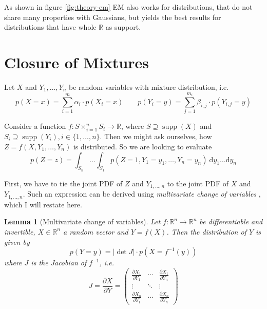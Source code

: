\documentclass[11pt,a4paper]{book}
\newtheorem{lemma}{Lemma}
\DeclareMathOperator{\supp}{supp}
\begin{document}
As shown in figure \ref{fig:theory-em} EM also works for distributions, that do
not share many properties with Gaussians, but yields the best results for
distributions that have whole $\mathbb{R}$ as support.

\section{Closure of Mixtures}
\label{sec:closure}

Let $X$ and $Y_{1}, \dots, Y_{n}$ be random variables with mixture distribution,
i.e.
\begin{equation*}
  p(X = x) = \sum_{i = 1}^{m} \alpha_{i} \cdot p(X_{i} = x) \qquad p(Y_{i} = y) = \sum_{j = 1}^{m_{i}} \beta_{i,j} \cdot p(Y_{i,j} = y)
\end{equation*}

Consider a function $f : S \times_{i = 1}^{n} S_{i} \rightarrow \mathbb{R}$,
where $S \supseteq \supp(X)$ and
$S_{i} \supseteq \supp(Y_{i}), i \in \{ 1, \dots, n \}$. Then we might ask
ourselves, how $Z = f(X, Y_{1}, \dots, Y_{n})$ is distributed. So we are looking
to evaluate
\begin{equation*}
  p(Z = z) = \int_{S_{n}}\dots\int_{S_{1}} p(Z = 1, Y_{1} = y_{1}, \dots, Y_{n} = y_{n})~\mathrm{d}y_{1}\dots\mathrm{d}y_{n}
\end{equation*}

First, we have to tie the joint PDF of $Z$ and $Y_{1, \dots, n}$ to the joint
PDF of $X$ and $Y_{1, \dots, n}$. Such an expression can be derived using
\emph{multivariate change of variables} \cite[chapter~2.6.2.1]{murphy}, which I
will restate here.

\begin{lemma}[Multivariate change of variables]
  \label{lemma:multivariate-change}
  Let $f : \mathbb{R}^{n} \rightarrow \mathbb{R}^{n}$ be differentiable and
  invertible, $X \in \mathbb{R}^{n}$ a random vector and $Y = f(X)$. Then the
  distribution of $Y$ is given by
  \begin{equation*}
    p(Y = y) = \left| \det J \right| \cdot p(X = f^{-1}(y))
  \end{equation*}
  where $J$ is the Jacobian of $f^{-1}$, i.e.
  \begin{equation*}
    J = \frac{\partial X}{\partial Y} = \begin{pmatrix}
      \frac{\partial X_{1}}{\partial Y_{1}} & \cdots & \frac{\partial X_{1}}{\partial Y_{n}}\\
      \vdots & \ddots & \vdots\\
      \frac{\partial X_{n}}{\partial Y_{1}} & \cdots & \frac{\partial X_{n}}{\partial Y_{n}}
    \end{pmatrix}
  \end{equation*}
\end{lemma}
\end{document}
